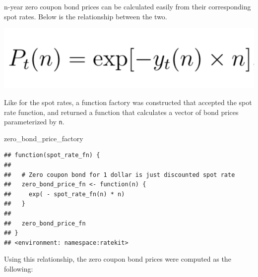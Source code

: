 \documentclass[]{book}
\newenvironment{Shaded}{\begin{snugshade}}{\end{snugshade}}
\newcommand{\DataTypeTok}[1]{\textcolor[rgb]{0.13,0.29,0.53}{#1}}
\newcommand{\DecValTok}[1]{\textcolor[rgb]{0.00,0.00,0.81}{#1}}
\newcommand{\KeywordTok}[1]{\textcolor[rgb]{0.13,0.29,0.53}{\textbf{#1}}}
\newcommand{\NormalTok}[1]{#1}
\newcommand{\OperatorTok}[1]{\textcolor[rgb]{0.81,0.36,0.00}{\textbf{#1}}}
\newcommand{\StringTok}[1]{\textcolor[rgb]{0.31,0.60,0.02}{#1}}
\theoremstyle{definition}
\theoremstyle{definition}
\theoremstyle{definition}
\theoremstyle{remark}
\begin{document}
n-year zero coupon bond prices can be calculated easily from their
corresponding spot rates. Below is the relationship between the two.

\begin{center}\includegraphics[width=8.08in]{images/zero-prices} \end{center}

Like for the spot rates, a function factory was constructed that
accepted the spot rate function, and returned a function that calculates
a vector of bond prices parameterized by \texttt{n}.

\begin{Shaded}
\begin{Highlighting}[]
\NormalTok{zero_bond_price_factory}
\end{Highlighting}
\end{Shaded}

\begin{verbatim}
## function(spot_rate_fn) {
## 
##   # Zero coupon bond for 1 dollar is just discounted spot rate
##   zero_bond_price_fn <- function(n) {
##     exp( - spot_rate_fn(n) * n)
##   }
## 
##   zero_bond_price_fn
## }
## <environment: namespace:ratekit>
\end{verbatim}

Using this relationship, the zero coupon bond prices were computed as
the following:

\begin{Shaded}
\end{Shaded}
\end{document}
